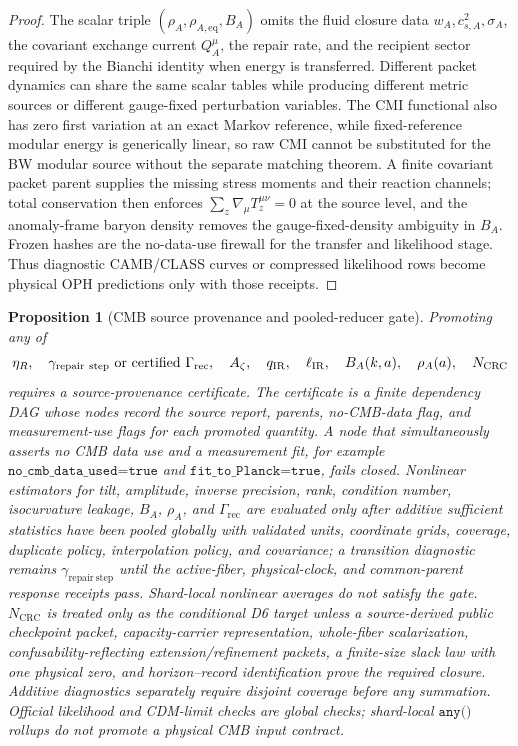 \documentclass[11pt]{article}
\newtheorem{proposition}[theorem]{Proposition}
\begin{document}
\begin{proof}
The scalar triple \((\rho_A,\rho_{A,\mathrm{eq}},B_A)\) omits the fluid closure
data \(w_A,c_{s,A}^2,\sigma_A\), the covariant exchange current \(Q_A^\mu\), the
repair rate, and the recipient sector required by the Bianchi identity when
energy is transferred. Different packet dynamics can share the same scalar
tables while producing different metric sources or different gauge-fixed
perturbation variables. The CMI functional also has zero first variation at an
exact Markov reference, while fixed-reference modular energy is generically
linear, so raw CMI cannot be substituted for the BW modular source without the
separate matching theorem. A finite covariant packet parent supplies the missing
stress moments and their reaction channels; total conservation then enforces
\(\sum_z\nabla_\mu T_z^{\mu\nu}=0\) at the source level, and the anomaly-frame
baryon density removes the gauge-fixed-density ambiguity in \(B_A\). Frozen
hashes are the no-data-use firewall for the transfer and likelihood stage. Thus
diagnostic CAMB/CLASS curves or compressed likelihood rows become physical OPH
predictions only with those receipts.
\end{proof}

\begin{proposition}[CMB source provenance and pooled-reducer gate]\label{prop:compact-cmb-source-provenance-gate}
Promoting any of
\[
\eta_R,\quad \gamma_{\mathrm{repair\ step}}\hbox{ or certified }\Gamma_{\mathrm{rec}},
\quad A_\zeta,\quad q_{\mathrm{IR}},
\quad \ell_{\mathrm{IR}},\quad B_A(k,a),\quad \rho_A(a),\quad N_{\mathrm{CRC}}
\]
requires a source-provenance certificate. The certificate is a finite
dependency DAG whose nodes record the source report, parents, no-CMB-data flag,
and measurement-use flags for each promoted
quantity.  A node that simultaneously asserts no CMB data use and a
measurement fit, for example \(\texttt{no\_cmb\_data\_used=true}\) and
\(\texttt{fit\_to\_Planck=true}\), fails closed.  Nonlinear estimators for
tilt, amplitude, inverse precision, rank, condition number, isocurvature
leakage, \(B_A\), \(\rho_A\), and \(\Gamma_{\mathrm{rec}}\) are evaluated only
after additive sufficient statistics have been pooled globally with validated
units, coordinate grids, coverage, duplicate policy, interpolation policy, and
covariance; a transition diagnostic remains \(\gamma_{\mathrm{repair\ step}}\)
until the active-fiber, physical-clock, and common-parent response receipts
pass.  Shard-local nonlinear averages do not satisfy the gate.
\(N_{\mathrm{CRC}}\) is treated only as the conditional D6 target unless a source-derived public
checkpoint packet, capacity-carrier representation, whole-fiber scalarization,
confusability-reflecting extension/refinement packets, a finite-size slack law with one physical zero,
and horizon--record identification prove the required closure. Additive diagnostics separately
require disjoint coverage before any summation.
Official likelihood and CDM-limit checks are global checks; shard-local
\(\texttt{any()}\) rollups do not promote a physical CMB input contract.
\end{proposition}
\end{document}
